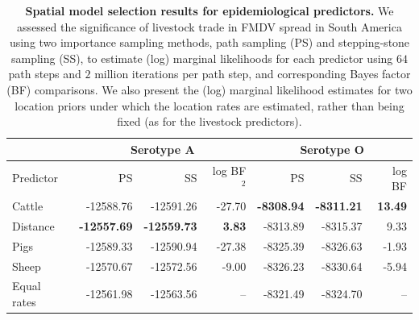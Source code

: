 \documentclass[10pt]{article}
\begin{document}
\newpage
\begin{table}[H]
\caption{
\textbf{Spatial model selection results for epidemiological predictors.}
We assessed the significance of livestock trade in FMDV spread in South America using two importance sampling methods, path sampling (PS) and stepping-stone sampling (SS), to estimate (log) marginal likelihoods for each predictor using $64$ path steps and $2$ million iterations per path step, and corresponding Bayes factor (BF) comparisons.
We also present the (log) marginal likelihood estimates for two location priors under which the location rates are estimated, rather than being fixed (as for the livestock predictors).
}
\begin{center}
\begin{tabular}{lrrrrrr}
\toprule
 & \multicolumn{3}{c}{Serotype A}& \multicolumn{3}{c}{Serotype O}\\
 \midrule
Predictor & PS & SS & log BF$^2$ & PS & SS & log BF \\
Cattle&-12588.76&-12591.26&-27.70&\textbf{-8308.94}&\textbf{-8311.21}& \textbf{13.49}\\
Distance&\textbf{-12557.69}&\textbf{-12559.73}&\textbf{3.83}&-8313.89&-8315.37&9.33\\
Pigs&-12589.33&-12590.94&-27.38&-8325.39&-8326.63&-1.93\\
Sheep&-12570.67&-12572.56&-9.00&-8326.23&-8330.64&-5.94\\
Equal rates &-12561.98&-12563.56&--&-8321.49&-8324.70&--\\
\bottomrule
\end{tabular}
\end{center}
\begin{flushleft}
\end{flushleft}
\label{tab:preds}
 \end{table}
\newpage
\end{document}

